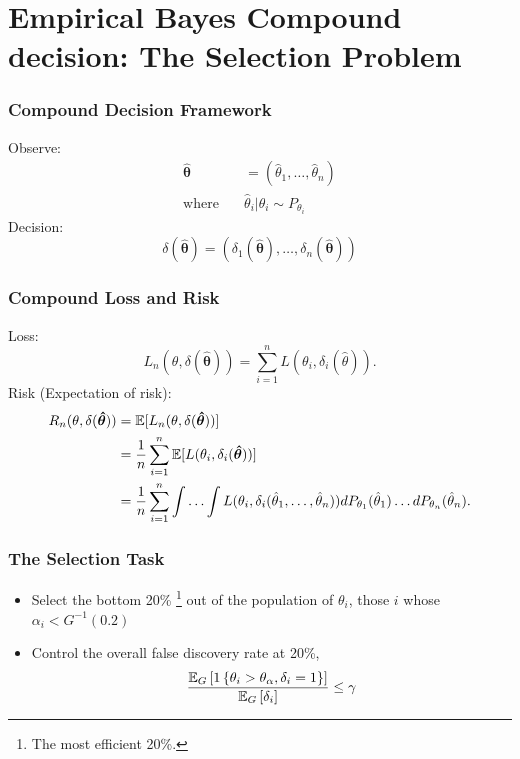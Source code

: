 \documentclass[10pt,mathserif,aspectratio=169]{beamer}
\begin{document}
\section{Empirical Bayes Compound decision: The Selection Problem}

\begin{frame}
  \frametitle{Compound Decision Framework}
  Observe:
  \begin{align*}
    \boldsymbol{\hat{\theta}} & =  (\hat{\theta}_1,\ldots, \hat{\theta}_n)  \\
    \text{where} \quad        & \hat{\theta}_i | \theta_i \sim P_{\theta_i}
  \end{align*}
  Decision:
  \begin{equation*}
    \delta(\boldsymbol{\hat{\theta}}) = (\delta_1(\boldsymbol{\hat{\theta}}), \ldots, \delta_n(\boldsymbol{\hat{\theta}}))
  \end{equation*}
\end{frame}

\begin{frame}
  \frametitle{Compound Loss and Risk}
  Loss:
  \begin{equation*}
    L_n(\theta, \delta(\boldsymbol{\hat{\theta}})) = \sum_{i=1}^n L(\theta_i, \delta_i(\hat{\theta})).
  \end{equation*}
  Risk (Expectation of risk):
  \begin{align*}
    R_n(\theta, \delta(\boldsymbol{\hat{\theta}})) & = \mathbb{E}[L_n(\theta, \delta(\boldsymbol{\hat{\theta}}))]                                                                                                                       \\
                                                   & = \frac{1}{n}\sum_{i=1}^n \mathbb{E}[L(\theta_i, \delta_i(\boldsymbol{\hat{\theta}}))]                                                                                             \\
                                                   & = \frac{1}{n}\sum_{i=1}^n \int \ldots \int L(\theta_i, \delta_i(\hat{\theta}_1, \ldots, \hat{\theta}_n))dP_{\theta_1}(\hat{\theta}_1)\ldots dP_{\theta_n}(\hat{\theta}_n). \\
  \end{align*}

\end{frame}

\begin{frame}
  \frametitle{The Selection Task}
  \begin{itemize}\itemsep=12pt
    \item Select the bottom 20\% \footnote{The most efficient 20\%.} out of the
          population of $\theta_i$, those $i$ whose $\alpha_i<G^{-1}(0.2)$
    \item Control the overall false discovery rate at 20\%, \begin{equation*}
            \frac{\mathbb{E}_G\left[1\left\{\theta_i>\theta_{\alpha},\delta_i=1\right\}\right]}{\mathbb{E}_G\left[\delta_i\right]} \le \gamma
          \end{equation*}
  \end{itemize}
\end{frame}
\end{document}
